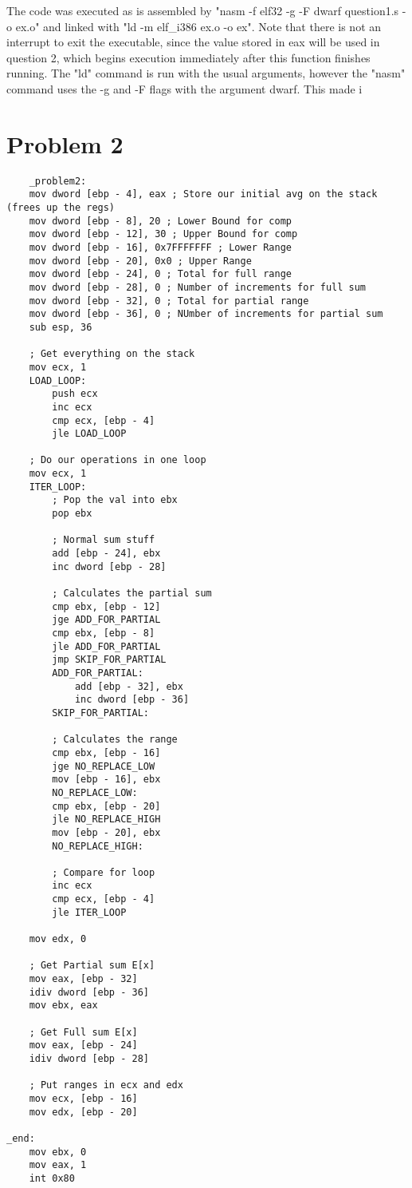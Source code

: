 \documentclass[11pt]{article}
\begin{document}
The code was executed as is assembled by "nasm -f elf32 -g -F dwarf question1.s -o ex.o" and linked with "ld -m elf\_i386 ex.o -o ex". Note that there is not an interrupt to exit the executable, since the value stored in eax will be used in question 2, which begins execution immediately after this function finishes running. The "ld" command is run with the usual arguments, however the "nasm" command uses the -g and -F flags with the argument dwarf. This made i

\pagebreak

\section*{Problem 2}
\begin{lstlisting}
    _problem2:
    mov dword [ebp - 4], eax ; Store our initial avg on the stack (frees up the regs)
    mov dword [ebp - 8], 20 ; Lower Bound for comp
    mov dword [ebp - 12], 30 ; Upper Bound for comp
    mov dword [ebp - 16], 0x7FFFFFFF ; Lower Range
    mov dword [ebp - 20], 0x0 ; Upper Range
    mov dword [ebp - 24], 0 ; Total for full range
    mov dword [ebp - 28], 0 ; Number of increments for full sum
    mov dword [ebp - 32], 0 ; Total for partial range
    mov dword [ebp - 36], 0 ; NUmber of increments for partial sum
    sub esp, 36 

    ; Get everything on the stack
    mov ecx, 1
    LOAD_LOOP:
        push ecx
        inc ecx
        cmp ecx, [ebp - 4]
        jle LOAD_LOOP

    ; Do our operations in one loop    
    mov ecx, 1
    ITER_LOOP:
        ; Pop the val into ebx
        pop ebx

        ; Normal sum stuff
        add [ebp - 24], ebx
        inc dword [ebp - 28]

        ; Calculates the partial sum
        cmp ebx, [ebp - 12]
        jge ADD_FOR_PARTIAL
        cmp ebx, [ebp - 8]
        jle ADD_FOR_PARTIAL
        jmp SKIP_FOR_PARTIAL
        ADD_FOR_PARTIAL:
            add [ebp - 32], ebx
            inc dword [ebp - 36]
        SKIP_FOR_PARTIAL:

        ; Calculates the range
        cmp ebx, [ebp - 16]
        jge NO_REPLACE_LOW
        mov [ebp - 16], ebx
        NO_REPLACE_LOW:
        cmp ebx, [ebp - 20]
        jle NO_REPLACE_HIGH
        mov [ebp - 20], ebx
        NO_REPLACE_HIGH:

        ; Compare for loop
        inc ecx
        cmp ecx, [ebp - 4]
        jle ITER_LOOP
    
    mov edx, 0

    ; Get Partial sum E[x]
    mov eax, [ebp - 32]
    idiv dword [ebp - 36]
    mov ebx, eax

    ; Get Full sum E[x]
    mov eax, [ebp - 24]
    idiv dword [ebp - 28]

    ; Put ranges in ecx and edx
    mov ecx, [ebp - 16]
    mov edx, [ebp - 20]
        
_end:
    mov ebx, 0
    mov eax, 1
    int 0x80
\end{lstlisting}
\end{document}
